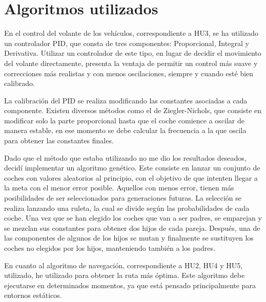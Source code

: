 
\section{Algoritmos utilizados}
En el control del volante de los vehículos, correspondiente a HU3, se ha utilizado un controlador PID, que consta de tres componentes: Proporcional, Integral y Derivativa. Utilizar un controlador de este tipo, en lugar de decidir el movimiento del volante directamente, presenta la ventaja de permitir un control más suave y correcciones más realistas y con menos oscilaciones, siempre y cuando esté bien calibrado.

\bigskip
La calibración del PID se realiza modificando las constantes asociadas a cada componente. Existen diversos métodos como el de Ziegler-Nichols\cite{enwiki:1140258750}, que consiste en modificar solo la parte proporcional hasta que el coche comience a oscilar de manera estable, en ese momento se debe calcular la frecuencia a la que oscila para obtener las constantes finales. 

\bigskip

Dado que el método que estaba utilizando no me dio los resultados deseados, decidí implementar un algoritmo genético. Este consiste en lanzar un conjunto de coches con valores aleatorios al principio, con el objetivo de que intenten llegar a la meta con el menor error posible. Aquellos con menos error, tienen más posibilidades de ser seleccionados para generaciones futuras. La selección se realiza lanzando una ruleta\cite{enwiki:1141636554}, la cual se divide según las probabilidades de cada coche. Una vez que se han elegido los coches que van a ser padres, se emparejan y se mezclan sus constantes para obtener dos hijos de cada pareja. Después, una de las componentes de algunos de los hijos se mutan y finalmente se sustituyen los coches no elegidos por los hijos, manteniendo también a los padres.

\bigskip

En cuanto al algoritmo de navegación, correspondiente a HU2, HU4 y HU5, utilizado, he utilizado \finalAlg para obtener la ruta más óptima. Este algoritmo debe ejecutarse en determinados momentos, ya que está pensado principalmente para entornos estáticos.